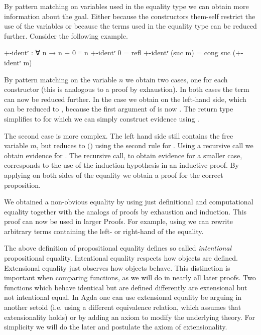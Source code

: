 By pattern matching on variables used in the equality type we can obtain more
information about the goal.
Either because the constructors them-self restrict the use of the variables or
because the terms used in the equality type can be reduced further.
Consider the following example.

\begin{code}
+-identʳ : ∀ n → n + 0 ≡ n
+-identʳ 0        = refl
+-identʳ (suc m)  = cong suc (+-identʳ m)
\end{code}
By pattern matching on the variable $n$ we obtain two cases, one for each
constructor (this is analogous to a proof by exhaustion).
In both cases the term
\AgdaSpace{}\AgdaFunction{}\AgdaSpace{}
can now be reduced further.
In the  case we obtain
\AgdaSpace{}\AgdaFunction{+}\AgdaSpace{}
on the left-hand side, which can be reduced to , because the first
argument of \AgdaFunction{+} is now .
The return type simplifies to 
\AgdaSpace{}\AgdaSpace{}
for which we can simply construct evidence using
.

The second case is more complex.
The left hand side still contains the free variable $m$, but reduces to
\AgdaSpace{}$($\AgdaSpace{}\AgdaFunction{+}\AgdaSpace{}$)$
using the second rule for \AgdaFunction{\_+\_}.
Using a recursive call we obtain evidence for
\AgdaSpace{}\AgdaFunction{+}\AgdaSpace{}\AgdaSpace{}\AgdaSpace{}.
The recursive call, to obtain evidence for a smaller case, corresponds to the use
of the induction hypothesis in an inductive proof.
By applying  on both sides of the equality we
obtain a proof for the correct proposition.

We obtained a non-obvious equality by using just definitional and computational
equality together with the analogs of proofs by exhaustion and induction.
This proof can now be used in larger Proofs.
For example, using  we can rewrite arbitrary terms containing
the left- or right-hand of the equality.

The above definition of propositional equality defines so called
\textit{intentional} propositional equality.
Intentional equality respects how objects are defined.
Extensional equality just observes how objects behave.
This distinction is important when comparing functions, as we will do in nearly
all later proofs.
Two functions which behave identical but are defined differently are
extensional but not intentional equal.
In Agda one can use extensional equality be arguing in another setoid (i.e.
using a different equivalence relation, which assumes that extensionality holds)
or by adding an axiom to modify the underlying theory.
For simplicity we will do the later and postulate the axiom of extensionality.

